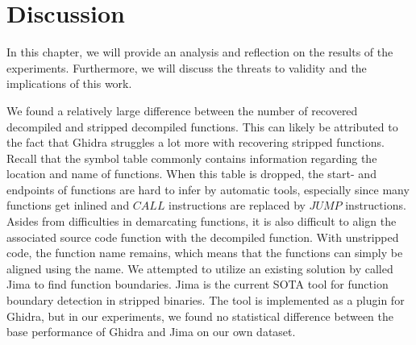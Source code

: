 \chapter{Discussion}
\label{discussion}
In this chapter, we will provide an analysis and reflection on the results of the experiments. Furthermore, we will discuss the threats to validity and the implications of this work.

We found a relatively large difference between the number of recovered decompiled and stripped decompiled functions. This can likely be attributed to the fact that Ghidra struggles a lot more with recovering stripped functions. Recall that the symbol table commonly contains information regarding the location and name of functions. When this table is dropped, the start- and endpoints of functions are hard to infer by automatic tools, especially since many functions get inlined and \(CALL\) instructions are replaced by \(JUMP\) instructions. Asides from difficulties in demarcating functions, it is also difficult to align the associated source code function with the decompiled function. With unstripped code, the function name remains, which means that the functions can simply be aligned using the name. We attempted to utilize an existing solution by \citeauthor{FunctionBoundaryDetection} called Jima \cite{FunctionBoundaryDetection} to find function boundaries. Jima is the current SOTA tool for function boundary detection in stripped binaries. The tool is implemented as a plugin for Ghidra, but in our experiments, we found no statistical difference between the base performance of Ghidra and Jima on our own dataset.

